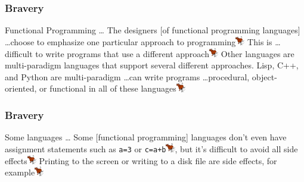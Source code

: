 {


\begin{frame}
\frametitle{Bravery}
\begin{block}{Functional Programming \ldots}
The designers [of functional programming languages] \ldots choose to emphasize one particular approach to programming\includegraphics[height=0.4cm]{image/bullshit.jpg} This is \ldots difficult to write programs that use a different approach\includegraphics[height=0.4cm]{image/bullshit.jpg} Other languages are multi-paradigm languages that support several different approaches. Lisp, C++, and Python are multi-paradigm \ldots can write programs \ldots procedural, object-oriented, or functional in all of these languages\includegraphics[height=0.4cm]{image/bullshit.jpg}
\end{block}
\end{frame}


\begin{frame}
\frametitle{Bravery}
\begin{block}{Some languages \ldots}
Some [functional programming] languages don't even have assignment statements such as \lstinline$a=3$ or \lstinline{c=a+b}\includegraphics[height=0.4cm]{image/bullshit.jpg}, but it's difficult to avoid all side effects\includegraphics[height=0.4cm]{image/bullshit.jpg} Printing to the screen or writing to a disk file are side effects, for example\includegraphics[height=0.4cm]{image/bullshit.jpg}
\end{block}
\end{frame}


}
